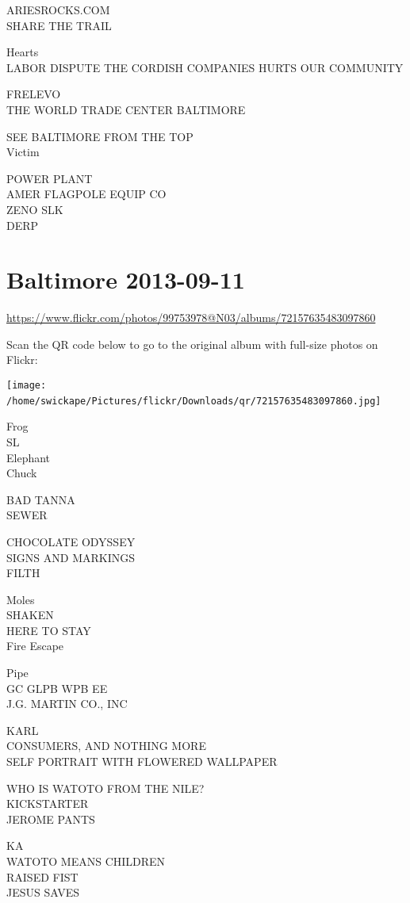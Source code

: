 \documentclass[10pt,letterpaper]{article}
\begin{document}
ARIESROCKS.COM\\
SHARE THE TRAIL

Hearts\\
LABOR DISPUTE THE CORDISH COMPANIES HURTS OUR COMMUNITY

FRELEVO\\
THE WORLD TRADE CENTER BALTIMORE

SEE BALTIMORE FROM THE TOP\\
Victim

POWER PLANT\\
AMER FLAGPOLE EQUIP CO\\
ZENO SLK\\
DERP
\

\section*{Baltimore 2013-09-11}

\url{https://www.flickr.com/photos/99753978@N03/albums/72157635483097860}

Scan the QR code below to go to the original album with full-size photos on Flickr:

\texttt{[image: /home/swickape/Pictures/flickr/Downloads/qr/72157635483097860.jpg]}
\

Frog\\
SL\\
Elephant\\
Chuck

BAD TANNA\\
SEWER

CHOCOLATE ODYSSEY\\
SIGNS AND MARKINGS\\
FILTH

Moles\\
SHAKEN\\
HERE TO STAY\\
Fire Escape

Pipe\\
GC GLPB WPB EE\\
J.G. MARTIN CO., INC

KARL\\
CONSUMERS, AND NOTHING MORE\\
SELF PORTRAIT WITH FLOWERED WALLPAPER

WHO IS WATOTO FROM THE NILE?\\
KICKSTARTER\\
JEROME PANTS

KA\\
WATOTO MEANS CHILDREN\\
RAISED FIST\\
JESUS SAVES
\end{document}

